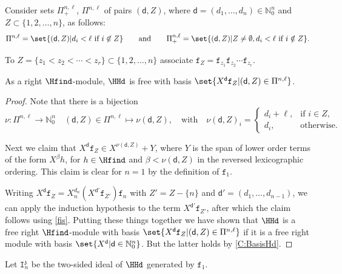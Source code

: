 \documentclass[a4paper,11pt]{amsart}
\numberwithin{equation}{subsection}
\theoremstyle{definition}
\theoremstyle{theorem}
\theoremstyle{remark}
\newcommand\charge{{\mathfrak{z}}}
\newcommand\Ic[1][n]{\mathtt{I}^\charge_{#1}}
\newcommand\bd{\mathsf{d}}
\begin{document}
 Consider sets $\Pi^{n,\ell}_+$, $\Pi^{n,\ell}$ of pairs $(\bd,Z)$, where $\bd=(d_1,\ldots,d_n) \in\mathbb{N}_0^n$ and $Z\subset\{1,2,\ldots, n\}$, as follows:
 \begin{equation}\label{domweights}
   \Pi^{n,\ell}=\set{(\bd,Z)| d_i<\ell\text{ if }i\not\in Z}\qquad\text{and}\qquad
   \Pi^{n,\ell}_+=\set{(\bd,Z)|Z\ne\emptyset, d_i<\ell \text{ if }i\notin Z}.
 \end{equation}


 To  $Z=\{z_1<z_2<\cdots <z_r\}\subset\{1,2, \ldots, n\}$ associate $\mathtt{f}_Z=\mathtt{f}_{z_1}\mathtt{f}_{z_2}\cdots \mathtt{f}_{z_r}$.


  \begin{Lemma}\label{free}
    As a  right $\Hfind$-module,  $\HHd$ is free with basis
    $\set{X^\bd \mathtt{f}_Z | (\bd,Z)\in \Pi^{n,\ell}}$.
  \end{Lemma}
  \begin{proof}
  Note that there is a bijection
  \[\nu\colon\Pi^{n,\ell} \rightarrow \mathbb{N}_0^n\quad  (\bd,Z)\in\Pi^{n,\ell}\mapsto  \nu(\bd,Z), \quad\text{with} \quad
  \nu(\bd,Z)_i=
  \begin{cases}
  d_i+\ell, &\text{if $i\in Z$},\\
  d_i, &\text{otherwise}.
  \end{cases}
  \]

  Next we claim that $X^\bd \mathtt{f}_Z\in X^{\nu(\bd,Z)}+Y$, where $Y$
  is the span of lower order terms of the form $X^\beta h$, for $h\in\Hfind$ and $\beta<\nu(\bd,Z)$ in the reversed lexicographic ordering. This claim is clear for $n=1$ by the definition of $\mathtt{f}_1$.

Writing $X^\bd
\mathtt{f}_Z=X_n^{d_n}(X^{\bd'}\mathtt{f}_{Z'})\mathtt{f}_n$ with
$Z'=Z-\{n\}$ and $\bd'=(d_1,\ldots,d_{n-1})$, we can apply the induction
hypothesis to the term $X^{\bd'}\mathtt{f}_{Z'}$,  after which the claim
follows using \autoref{fis}.  Putting these things together we have
shown that $\HHd$ is a free right $\Hfind$-module with basis
$\set{X^\bd \mathtt{f}_Z |(\bd,Z)\in \Pi^{n,\ell}}$ if it is a free
right module with basis $\set{X^\bd | \bd\in \mathbb{N}_0^n}$. But the latter holds by  \autoref{C:BasisHd}.
 \end{proof}


Let $\Ic$ be the two-sided ideal of $\HHd$ generated by $\mathtt{f}_1$.
\end{document}
